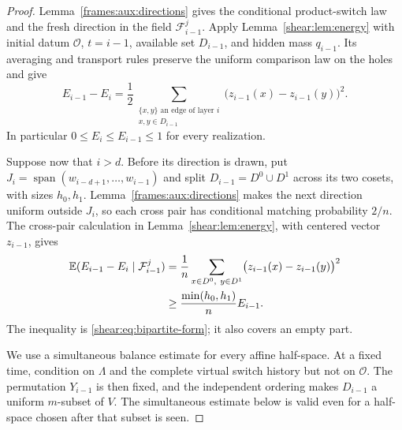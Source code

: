 \begin{proof}
Lemma~\ref{frames:aux:directions} gives the conditional product-switch
law and the fresh direction in the field $\mathcal F_{i-1}^j$.
Apply Lemma~\ref{shear:lem:energy} with initial datum $\mathcal O$,
$t=i-1$, available set $D_{i-1}$, and hidden mass $q_{i-1}$.
Its averaging and transport rules preserve the uniform comparison law
on the holes and give
\begin{equation}\label{frames:aux:energy-drop}
 E_{i-1}-E_i
 =\frac12\sum_{\substack{\{x,y\}\text{ an edge of layer }i\\
                         x,y\in D_{i-1}}}
       \bigl(z_{i-1}(x)-z_{i-1}(y)\bigr)^2.
\end{equation}
In particular $0\le E_i\le E_{i-1}\le1$ for every realization.

Suppose now that $i>d$. Before its direction is drawn, put
$J_i=\operatorname{span}(w_{i-d+1},\ldots,w_{i-1})$ and split
$D_{i-1}=D^0\cup D^1$ across its two cosets, with sizes $h_0,h_1$.
Lemma~\ref{frames:aux:directions} makes the next direction uniform
outside $J_i$, so each cross pair has conditional matching probability
$2/n$. The cross-pair calculation in
Lemma~\ref{shear:lem:energy}, with centered vector $z_{i-1}$, gives
\begin{align}
 \mathbb E(E_{i-1}-E_i\mid\mathcal F_{i-1}^j)
 &=\frac1n\sum_{x\in D^0,\ y\in D^1}
             \bigl(z_{i-1}(x)-z_{i-1}(y)\bigr)^2\notag\\
 &\ge\frac{\min(h_0,h_1)}n E_{i-1}.
 \label{frames:aux:cross-loss}
\end{align}
The inequality is \eqref{shear:eq:bipartite-form}; it also covers an
empty part.

We use a simultaneous balance estimate for every affine half-space.
At a fixed time, condition on $\Lambda$ and the complete virtual switch
history but not on $\mathcal O$. The permutation $Y_{i-1}$ is then fixed,
and the independent ordering makes $D_{i-1}$ a uniform $m$-subset of
$V$. The simultaneous estimate below is valid even for a half-space
chosen after that subset is seen.


\end{proof}
